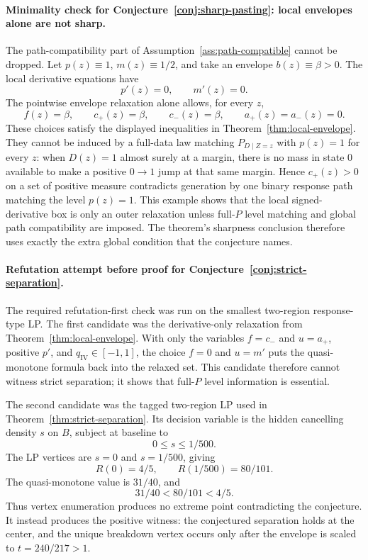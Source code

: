 \documentclass[11pt]{article}
\theoremstyle{definition}
\theoremstyle{plain}
\theoremstyle{remark}
\begin{document}
\paragraph{Minimality check for Conjecture~\ref{conj:sharp-pasting}: local envelopes alone are not sharp.}
The path-compatibility part of Assumption~\ref{ass:path-compatible} cannot be
dropped.  Let \(p(z)\equiv1\), \(m(z)\equiv1/2\), and take an envelope
\(b(z)\equiv\beta>0\).  The local derivative equations have
\[
p'(z)=0,\qquad m'(z)=0.
\]
The pointwise envelope relaxation alone allows, for every \(z\),
\[
f(z)=\beta,\qquad c_+(z)=\beta,\qquad c_-(z)=\beta,\qquad
a_+(z)=a_-(z)=0.
\]
These choices satisfy the displayed inequalities in
Theorem~\ref{thm:local-envelope}.  They cannot be induced by a full-data law
matching \(P_{D\mid Z=z}\) with \(p(z)=1\) for every \(z\): when \(D(z)=1\)
almost surely at a margin, there is no mass in state \(0\) available to make a
positive \(0\to1\) jump at that same margin.  Hence \(c_+(z)>0\) on a set of
positive measure contradicts generation by one binary response path matching
the level \(p(z)=1\).  This example shows that the local signed-derivative
box is only an outer relaxation unless full-\(P\) level matching and global
path compatibility are imposed.  The theorem's sharpness conclusion therefore
uses exactly the extra global condition that the conjecture names.

\paragraph{Refutation attempt before proof for Conjecture~\ref{conj:strict-separation}.}
The required refutation-first check was run on the smallest two-region
response-type LP.  The first candidate was the derivative-only relaxation from
Theorem~\ref{thm:local-envelope}.  With only the variables \(f=c_-\) and
\(u=a_+\), positive \(p'\), and \(q_{\mathrm{IV}}\in[-1,1]\), the choice
\(f=0\) and \(u=m'\) puts the quasi-monotone formula back into the relaxed
set.  This candidate therefore cannot witness strict separation; it shows that
full-\(P\) level information is essential.

The second candidate was the tagged two-region LP used in
Theorem~\ref{thm:strict-separation}.  Its decision variable is the hidden
cancelling density \(s\) on \(B\), subject at baseline to
\[
0\le s\le1/500.
\]
The LP vertices are \(s=0\) and \(s=1/500\), giving
\[
R(0)=4/5,\qquad R(1/500)=80/101.
\]
The quasi-monotone value is \(31/40\), and
\[
31/40<80/101<4/5.
\]
Thus vertex enumeration produces no extreme point contradicting the conjecture.
It instead produces the positive witness: the conjectured separation holds at
the center, and the unique breakdown vertex occurs only after the envelope is
scaled to \(t=240/217>1\).
\end{document}
